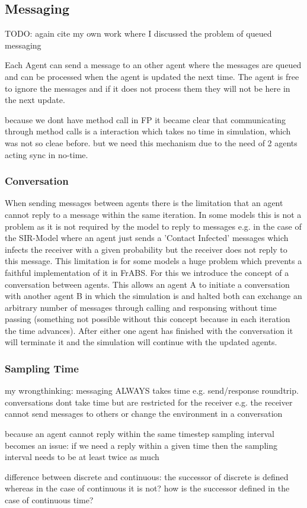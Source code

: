 \subsection{Messaging}
TODO: again cite my own work where I discussed the problem of queued messaging

Each Agent can send a message to an other agent where the messages are queued and can be processed when the agent is updated the next time. The agent is free to ignore the messages and if it does not process them they will not be here in the next update.

 because we dont have method call in FP it became clear that communicating through method calls is a interaction which takes no time in simulation, which was not so cleae before. but we need this mechanism due to the need of 2 agents acting sync in no-time.
 
\subsubsection{Conversation}
When sending messages between agents there is the limitation that an agent cannot reply to a message within the same iteration. In some models this is not a problem as it is not required by the model to reply to messages e.g. in the case of the SIR-Model where an agent just sends a 'Contact Infected' messages which infects the receiver with a given probability but the receiver does not reply to this message.
This limitation is for some models a huge problem which prevents a faithful implementation of it in FrABS. For this we introduce the concept of a conversation between agents. This allows an agent A to initiate a conversation with another agent B in which the simulation is and halted both can exchange an arbitrary number of messages through calling and responsing without time passing (something not possible without this concept because in each iteration the time advances). After either one agent has finished with the conversation it will terminate it and the simulation will continue with the updated agents.

\subsubsection{Sampling Time}
my wrongthinking: messaging ALWAYS takes time e.g. send/response roundtrip. conversations dont take time but are restricted for the receiver e.g. the receiver cannot send messages to others or change the environment in a conversation

because an agent cannot reply within the same timestep sampling interval becomes an issue: if we need a reply within a given time then the sampling interval needs to be at least twice as much

difference between discrete and continuous: the successor of discrete is defined whereas in the case of continuous it is not?
how is the successor defined in the case of continuous time?